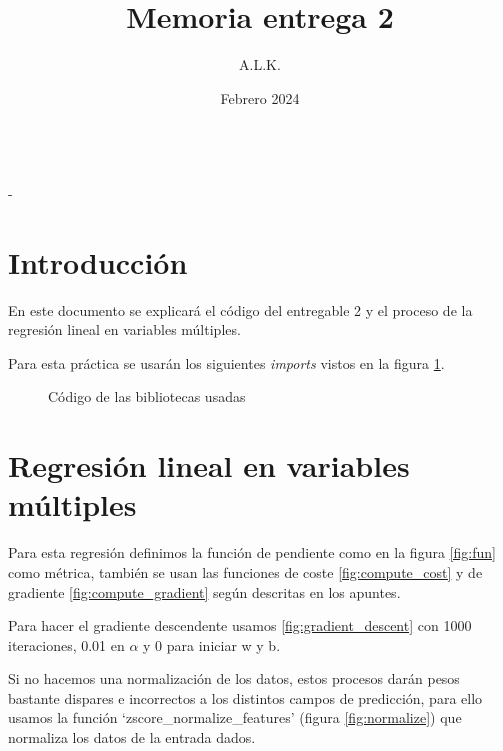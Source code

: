\documentclass[6pt]{AiTex}
\title{Memoria entrega 2}
\author{A.L.K.}
\date{Febrero 2024}
\begin{document}
\justify

\begin{center}

    {\huge \textbf{\underline{\subtitulo}}} \\
    { \lesson - \autor}

\end{center}


\section*{Introducción}

En este documento se explicará el código del entregable 2 y el proceso de la regresión lineal en variables múltiples.

Para esta práctica se usarán los siguientes \textit{imports} vistos en la figura \ref{fig:imports}.

\begin{figure}[H]
    \centering
    
    \caption{Código de las bibliotecas usadas}
    \label{fig:imports}
\end{figure}

\section{Regresión lineal en variables múltiples}

Para esta regresión definimos la función de pendiente como en la figura \ref{fig:fun} como métrica, también se usan las funciones de coste \ref{fig:compute_cost} y de gradiente \ref{fig:compute_gradient} según descritas en los apuntes.

Para hacer el gradiente descendente usamos \ref{fig:gradient_descent} con 1000 iteraciones, 0.01 en $\alpha$ y 0 para iniciar w y b.

Si no hacemos una normalización de los datos, estos procesos darán pesos bastante dispares e incorrectos a los distintos campos de predicción, para ello usamos la función `zscore\_normalize\_features' (figura \ref{fig:normalize}) que normaliza los datos de la entrada dados.
\end{document}
